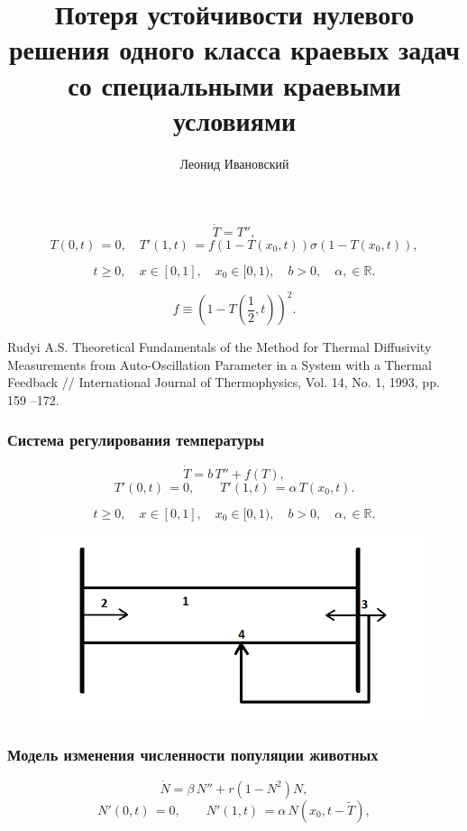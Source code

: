 \documentclass[fullscreen=true, unicode, bookmarks=false]{beamer}
\title[]{ {\huge Потеря устойчивости нулевого решения одного класса краевых задач со специальными краевыми условиями} }
\author[]{{\Large Леонид Ивановский}}
\date{ }
\institute[]
\begin{document}
\begin{frame}
\titlepage
\end{frame} 

\begin{frame}

$$
\dot{T} = T'',
$$
$$
T(0, t) \, = 0, \quad T'(1, t) \, = f(1 - T (x_0, t)) \sigma (1 - T (x_0, t)), 
$$

$$ t \geqslant 0, \quad x \in [0,1], \quad x_0 \in [0, 1), \quad  b > 0, \quad \alpha, \in \mathbb{R}. $$

\vfill

$$  f\equiv\left(1 - T\left(\frac{1}{2}, t \right)\right)^2. $$

\vfill

Rudyi A.S. Theoretical Fundamentals of the Method for Thermal Diffusivity Measurements from Auto-Oscillation Parameter in a System with a Thermal Feedback // International Journal of Thermophysics, Vol. 14, No. 1, 1993, pp. 159 --172.

\end{frame}

\begin{frame}
\frametitle{Система регулирования температуры}

$$
\dot{T} = b \, T'' + f(T),
$$
$$
T'(0, t) \, = 0, \qquad T'(1, t) \, = \alpha\,T(x_0, t).
$$

$$ t \geqslant 0, \quad x \in [0,1], \quad x_0 \in [0, 1), \quad  b > 0, \quad \alpha, \in \mathbb{R}. $$

\vfill

\begin{figure} 
\includegraphics[scale=0.35]{Physical_model.png}  
\end{figure}

\vfill

\end{frame}

\begin{frame}
\frametitle{Модель изменения численности популяции животных}

$$
\dot{N} = \beta \, N'' + r(1 - N^2)N,
$$
$$
N'(0, t) \, = 0, \qquad N'(1, t) \, = \alpha\,N(x_0, t-\tilde{T}),
$$

\end{frame}
\end{document}
